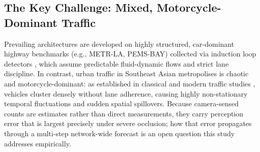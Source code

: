 \documentclass[preprint,12pt]{elsarticle}
\begin{document}
\subsection{The Key Challenge: Mixed, Motorcycle-Dominant Traffic}
\label{sec:gap}
\begin{table}[htbp]
\centering
\caption{Comparative overview of representative spatio-temporal traffic forecasting architectures, highlighting the gap in camera-sensed mixed-traffic research.}
\label{tab:related_comparison}
\small
\setlength{\tabcolsep}{4pt}
\renewcommand{\arraystretch}{1.15}
\end{table}
Prevailing architectures are developed on highly structured, car-dominant highway benchmarks (e.g., METR-LA, PEMS-BAY) collected via induction loop detectors \citep{dcrnn, stgcn}, which assume predictable fluid-dynamic flows and strict lane discipline. In contrast, urban traffic in Southeast Asian metropolises is chaotic and motorcycle-dominant: as established in classical and modern traffic studies \citep{cao2007, lee2009, mixedtraffic_stgnn}, vehicles cluster densely without lane adherence, causing highly non-stationary temporal fluctuations and sudden spatial spillovers. Because camera-sensed counts are estimates rather than direct measurements, they carry perception error that is largest precisely under severe occlusion; how that error propagates through a multi-step network-wide forecast is an open question this study addresses empirically.
\end{document}
